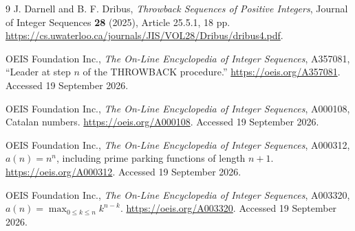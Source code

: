 \documentclass[11pt,letterpaper]{article}
\theoremstyle{definition}
\begin{document}
\begin{thebibliography}{9}
J. Darnell and B. F. Dribus,
\emph{Throwback Sequences of Positive Integers},
Journal of Integer Sequences \textbf{28} (2025), Article 25.5.1, 18 pp.
\url{https://cs.uwaterloo.ca/journals/JIS/VOL28/Dribus/dribus4.pdf}.

OEIS Foundation Inc., \emph{The On-Line Encyclopedia of Integer Sequences},
A357081, ``Leader at step $n$ of the THROWBACK procedure.''
\url{https://oeis.org/A357081}. Accessed 19 September 2026.

OEIS Foundation Inc., \emph{The On-Line Encyclopedia of Integer Sequences},
A000108, Catalan numbers.
\url{https://oeis.org/A000108}. Accessed 19 September 2026.

OEIS Foundation Inc., \emph{The On-Line Encyclopedia of Integer Sequences},
A000312, $a(n)=n^n$, including prime parking functions of length $n+1$.
\url{https://oeis.org/A000312}. Accessed 19 September 2026.

OEIS Foundation Inc., \emph{The On-Line Encyclopedia of Integer Sequences},
A003320, $a(n)=\max_{0\le k\le n}k^{n-k}$.
\url{https://oeis.org/A003320}. Accessed 19 September 2026.
\end{thebibliography}
\end{document}
